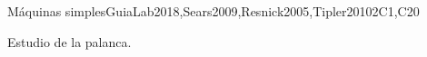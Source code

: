 \begin{syllabus}
\begin{unit}{Máquinas simples}{}{GuiaLab2018,Sears2009,Resnick2005,Tipler2010}{2}{C1,C20}
   \begin{topics}
	\item Estudio de la palanca.
   \end{topics}
\end{unit}



\begin{coursebibliography}
\end{coursebibliography}

\end{syllabus}
